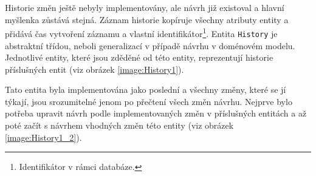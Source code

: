         Historie změn ještě nebyly implementovány, ale návrh již existoval a hlavní myšlenka zůstává stejná. Záznam historie kopíruje všechny atributy entity a přidává čas vytvoření záznamu a vlastní identifikátor\footnote{Identifikátor v rámci databáze.}. Entita \verb|History| je abstraktní třídou, neboli generalizací v případě návrhu v doménovém modelu. Jednotlivé entity, které jsou zděděné od této entity, reprezentují historie příslušných entit (viz obrázek \ref{image:History1}). 
    
        Tato entita byla implementována jako poslední a všechny změny, které se jí týkají, jsou srozumitelné jenom po přečtení všech změn návrhu. Nejprve bylo potřeba upravit návrh podle implementovaných změn v příslušných entitách a až poté začít s návrhem vhodných změn této entity (viz obrázek \ref{image:History1_2}).
        

